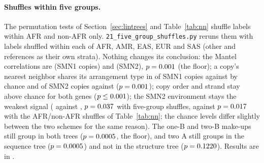 \paragraph{Shuffles within five groups.} The permutation tests of Section~\ref{sec:lintrees} and
Table~\ref{tab:nn} shuffle labels within AFR and non-AFR only. \texttt{21\_five\_group\_shuffles.py} reruns them with
labels shuffled within each of AFR, AMR, EAS, EUR and SAS (other and references as their own strata). Nothing changes
its conclusion: the Mantel correlations are \fgMantelOne{} (SMN1 copies) and \fgMantelTwo{} (SMN2), $p=0.001$
(the floor); a copy's nearest neighbor shares its arrangement type in \fgArrOne{} of SMN1 copies against \fgArrNullOne{}
by chance and \fgArrTwo{} of SMN2 copies against \fgArrNullTwo{} ($p=0.001$); copy order and strand stay above chance
for both genes ($p\le0.001$); the SMN2 environment stays the weakest signal (\fgEnvTwo{} against \fgEnvNullTwo,
$p=0.037$ with five-group shuffles, against $p=0.017$ with the AFR/non-AFR shuffles of Table~\ref{tab:nn};
the chance levels differ slightly between the two schemes for the same reason). The one-B and two-B make-ups still group in both trees ($p=0.0005$, the floor), and two A
still groups in the sequence tree ($p=0.0005$) and not in the structure tree ($p=0.1220$). Results are in
.

